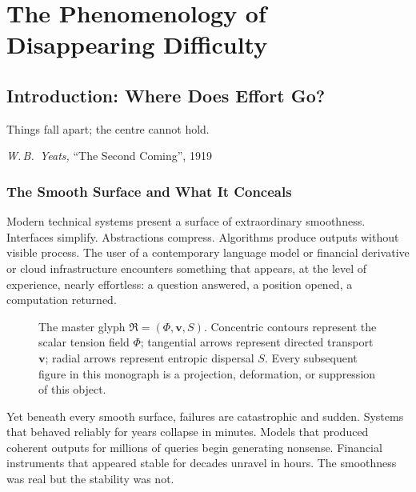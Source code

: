 \documentclass[12pt,a4paper,openany]{book}
\theoremstyle{plain}
\theoremstyle{definition}
\theoremstyle{remark}
\newcommand{\RSVPContours}[2]{%
  \foreach \r in {0.45,0.90,1.35,1.80}{%
    \draw[rsvp scalar] (#1,#2) circle (\r);}}
\newcommand{\RSVPFlowRing}[3]{%
  \foreach \ang in {0,45,...,315}{%
    \draw[rsvp flow]
      ({#1 + #3*cos(\ang)},{#2 + #3*sin(\ang)})
      -- ++({-0.35*sin(\ang)},{0.35*cos(\ang)});}}
\newcommand{\RSVPEntropyRays}[3]{%
  \foreach \ang in {0,60,...,300}{%
    \draw[rsvp entropy]
      (#1,#2) -- ({#1 + #3*cos(\ang)},{#2 + #3*sin(\ang)});}}
\newcommand{\RSVPMasterGlyph}[2]{%
  \RSVPContours{#1}{#2}%
  \RSVPFlowRing{#1}{#2}{1.10}%
  \RSVPEntropyRays{#1}{#2}{2.00}%
  \fill[blue!80] (#1,#2) circle (0.045);}
\begin{document}
\listoffigures
{}

\mainmatter


\part{The Phenomenology of Disappearing Difficulty}

\chapter{Introduction: Where Does Effort Go?}

\epigraph{%
  Things fall apart; the centre cannot hold.
}{%
  \textit{W.\,B.~Yeats,} ``The Second Coming'', 1919
}

\section{The Smooth Surface and What It Conceals}

Modern technical systems present a surface of extraordinary smoothness. Interfaces simplify. Abstractions compress. Algorithms produce outputs without visible process. The user of a contemporary language model or financial derivative or cloud infrastructure encounters something that appears, at the level of experience, nearly effortless: a question answered, a position opened, a computation returned.

\begin{figure}[h]
\centering
{}
\caption[The master RSVP glyph $\mathfrak{R}$]{The master glyph $\mathfrak{R} = (\Phi, \mathbf{v}, S)$. Concentric contours represent the scalar tension field $\Phi$; tangential arrows represent directed transport $\mathbf{v}$; radial arrows represent entropic dispersal $S$. Every subsequent figure in this monograph is a projection, deformation, or suppression of this object.}
\label{fig:master_glyph}
\end{figure}

Yet beneath every smooth surface, failures are catastrophic and sudden. Systems that behaved reliably for years collapse in minutes. Models that produced coherent outputs for millions of queries begin generating nonsense. Financial instruments that appeared stable for decades unravel in hours. The smoothness was real but the stability was not.
\end{document}
